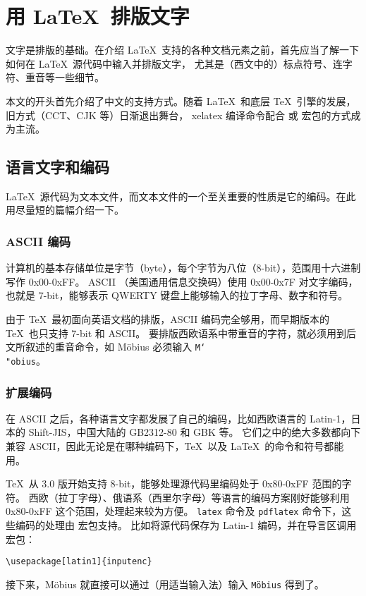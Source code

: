 \chapter{用 \LaTeX\ 排版文字}\label{chap:text}

\begin{intro}
文字是排版的基础。在介绍 \LaTeX\ 支持的各种文档元素之前，首先应当了解一下如何在 \LaTeX\ 源代码中输入并排版文字，
尤其是（西文中的）标点符号、连字符、重音等一些细节。

本文的开头首先介绍了中文的支持方式。随着 \LaTeX\ 和底层 \TeX\ 引擎的发展，旧方式（CCT、CJK 等）日渐退出舞台，
xelatex 编译命令配合  或  宏包的方式成为主流。
\end{intro}

\section{语言文字和编码}\label{sec:encoding}

\LaTeX\ 源代码为文本文件，而文本文件的一个至关重要的性质是它的编码。在此用尽量短的篇幅介绍一下。

\subsection{ASCII 编码}\label{subsec:ascii}

计算机的基本存储单位是字节（byte），每个字节为八位（8-bit），范围用十六进制写作 0x00-0xFF。
ASCII （美国通用信息交换码）使用 0x00-0x7F 对文字编码，也就是 7-bit，能够表示 QWERTY 键盘上能够输入的拉丁字母、数字和符号。

由于 \TeX\ 最初面向英语文档的排版，ASCII 编码完全够用，而早期版本的 \TeX\ 也只支持 7-bit 和 ASCII。
要排版西欧语系中带重音的字符，就必须用到后文所叙述的重音命令，如 M\"obius 必须输入 \texttt{M\char`\\"obius}。

\subsection{扩展编码}\label{subsec:ext-encoding}

在 ASCII 之后，各种语言文字都发展了自己的编码，比如西欧语言的 Latin-1，日本的 Shift-JIS，中国大陆的 GB2312-80 和 GBK 等。
它们之中的绝大多数都向下兼容 ASCII，因此无论是在哪种编码下，\TeX\ 以及 \LaTeX\ 的命令和符号都能用。

\TeX\ 从 3.0 版开始支持 8-bit，能够处理源代码里编码处于 0x80-0xFF 范围的字符。
西欧（拉丁字母）、俄语系（西里尔字母）等语言的编码方案刚好能够利用 0x80-0xFF 这个范围，处理起来较为方便。
\texttt{latex} 命令及 \texttt{pdflatex} 命令下，这些编码的处理由  宏包支持。
比如将源代码保存为 Latin-1 编码，并在导言区调用宏包：
\begin{verbatim}
\usepackage[latin1]{inputenc}
\end{verbatim}
接下来，M\"obius 就直接可以通过（用适当输入法）输入 \texttt{M\"obius} 得到了。

